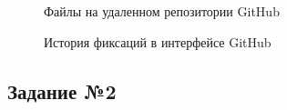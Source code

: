 \documentclass[a4paper, 14pt]{extarticle}
\begin{document}
\begin{figure}[H]
  \centering
  \caption{Файлы на удаленном репозитории GitHub}
  \label{fig:github-files}
\end{figure}

\begin{figure}[H]
  \centering
  \caption{История фиксаций в интерфейсе GitHub}
  \label{fig:github-commits}
\end{figure}

\subsection*{Задание №2}
\end{document}
